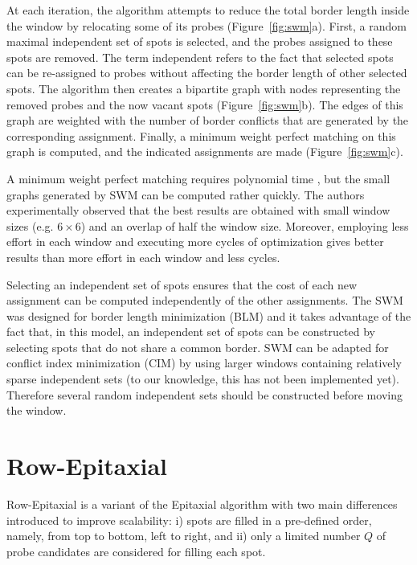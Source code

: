 At each iteration, the algorithm attempts to reduce the total border length
inside the window by relocating some of its probes (Figure~\ref{fig:swm}a).
First, a random maximal independent set of spots is selected, and the probes
assigned to these spots are removed. The term independent refers to the fact
that selected spots can be re-assigned to probes without affecting the border
length of other selected spots. The algorithm then creates a bipartite graph
with nodes representing the removed probes and the now vacant spots
(Figure~\ref{fig:swm}b). The edges of this graph are weighted with the number of
border conflicts that are generated by the corresponding assignment.  Finally, a
minimum weight perfect matching on this graph is computed, and the indicated
assignments are made (Figure~\ref{fig:swm}c).

A minimum weight perfect matching requires polynomial time \citep{Gross2004},
but the small graphs generated by SWM can be computed rather quickly. The
authors experimentally observed that the best results are obtained with small
window sizes (e.g. $6\times 6$) and an overlap of half the window size.
Moreover, employing less effort in each window and executing more cycles of
optimization gives better results than more effort in each window and less
cycles.

Selecting an independent set of spots ensures that the cost of each new
assignment can be computed independently of the other assignments. The SWM was
designed for border length minimization (BLM) and it takes advantage of the fact
that, in this model, an independent set of spots can be constructed by selecting
spots that do not share a common border. SWM can be adapted for conflict index
minimization (CIM) by using larger windows containing relatively sparse
independent sets (to our knowledge, this has not been implemented yet).
Therefore several random independent sets should be constructed before moving
the window.

\section{Row-Epitaxial}
\label{sec:placement_reptx}

Row-Epitaxial \citep{Kahng2003} is a variant of the Epitaxial algorithm with two
main differences introduced to improve scalability: i) spots are filled in a
pre-defined order, namely, from top to bottom, left to right, and ii) only a
limited number $Q$ of probe candidates are considered for filling each spot.

